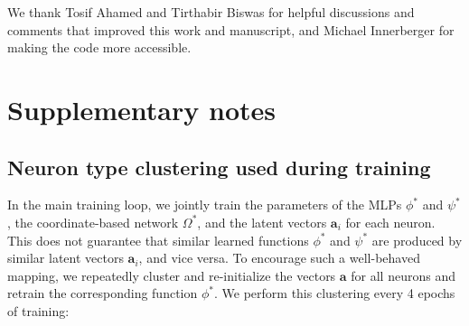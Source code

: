 \documentclass[10pt,twocolumn]{article}
\renewcommand\Vec[1]{\ensuremath{\boldsymbol{#1}}}
\begin{document}
We thank Tosif Ahamed and Tirthabir Biswas for helpful discussions and comments that improved this work and manuscript, and Michael Innerberger for making the code more accessible. 

\printbibliography

\appendix

\renewcommand{\figurename}{Supplementary Figure}
\setcounter{figure}{0}
%
\newcommand{\equationname}{Supplementary Equation}
\setcounter{equation}{0}
%
\renewcommand{\tablename}{Supplementary Table}
\setcounter{table}{0}
%

\clearpage

\section{Supplementary notes}







\subsection{Neuron type clustering used during training}
\label{appendix:cluster-training}

In the main training loop, we jointly train the parameters of the MLPs $\phi^*$ and $\psi^*$, the coordinate-based network $\Omega^*$, and the latent vectors $\Vec{a}_i$ for each neuron.  This does not guarantee that similar learned functions $\phi^*$ and $\psi^*$ are produced by similar latent vectors $\Vec{a}_i$, and vice versa.  To encourage such a  well-behaved mapping, we repeatedly cluster and re-initialize the vectors $\Vec{a}$ for all neurons and retrain the corresponding function $\phi^*$.  We perform this clustering every 4 epochs of training:
\end{document}
